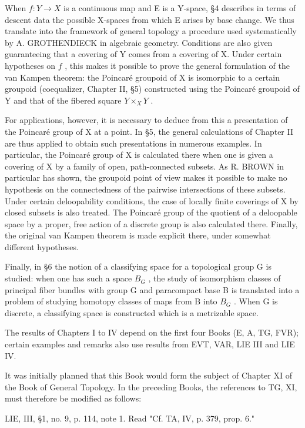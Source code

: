 \documentclass[12pt,a4paper,oneside]{book}
\begin{document}
When \(f \colon Y \to X\) is a continuous map and E is a Y-space, §4 describes in terms of descent data the possible X-spaces from which E arises by base change. We thus translate into the framework of general topology a procedure used systematically by A. GROTHENDIECK in algebraic geometry. Conditions are also given guaranteeing that a covering of Y comes from a covering of X. Under certain hypotheses on \(f\) , this makes it possible to prove the general formulation of the van Kampen theorem: the Poincaré groupoid of X is isomorphic to a certain groupoid (coequalizer, Chapter II, §5) constructed using the Poincaré groupoid of Y and that of the fibered square \(Y \times_X Y\) .

For applications, however, it is necessary to deduce from this a presentation of the Poincaré group of X at a point. In §5, the general calculations of Chapter II are thus applied to obtain such presentations in numerous examples. In particular, the Poincaré group of X is calculated there when one is given a covering of X by a family of open, path-connected subsets. As R. BROWN in particular has shown, the groupoid point of view makes it possible to make no hypothesis on the connectedness of the pairwise intersections of these subsets. Under certain deloopability conditions, the case of locally finite coverings of X by closed subsets is also treated. The Poincaré group of the quotient of a deloopable space by a proper, free action of a discrete group is also calculated there. Finally, the original van Kampen theorem is made explicit there, under somewhat different hypotheses.

Finally, in §6 the notion of a classifying space for a topological group G is studied: when one has such a space \(B_{G}\) , the study of isomorphism classes of principal fiber bundles with group G and paracompact base B is translated into a problem of studying homotopy classes of maps from B into \(B_{G}\) . When G is discrete, a classifying space is constructed which is a metrizable space.

The results of Chapters I to IV depend on the first four Books (E, A, TG, FVR); certain examples and remarks also use results from EVT, VAR, LIE III and LIE IV.

It was initially planned that this Book would form the subject of Chapter XI of the Book of General Topology. In the preceding Books, the references to TG, XI, must therefore be modified as follows:

LIE, III, §1, no. 9, p. 114, note 1. Read "Cf. TA, IV, p. 379, prop. 6."
\end{document}
